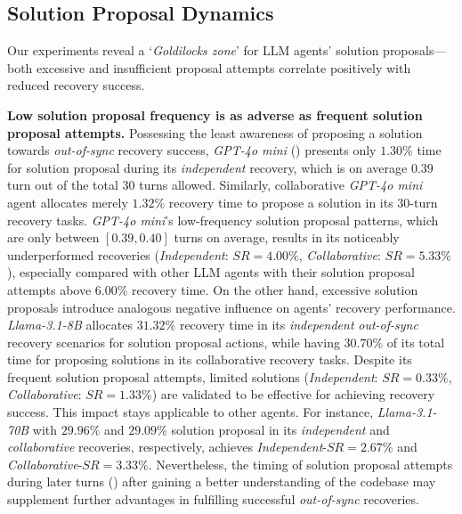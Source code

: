 \subsection{Solution Proposal Dynamics}
\label{Appendix:C.3 (Solution Proposal Dynamics)}

Our experiments reveal a `\textit{Goldilocks zone}' for LLM agents' \textcolor{fig2_code}{solution proposals}---both excessive and insufficient proposal attempts correlate positively with reduced recovery success.

\textbf{Low solution proposal frequency is as adverse as frequent solution proposal attempts.}
%
%
Possessing the least awareness of \textcolor{fig2_code}{proposing a solution} towards \textit{out-of-sync} recovery success, \textit{GPT-4o mini} () presents only $1.30\%$ time for \textcolor{fig2_code}{solution proposal} during its \textit{independent} recovery, which is on average $0.39$ turn out of the total $30$ turns allowed.
Similarly, collaborative \textit{GPT-4o mini} agent allocates merely $1.32\%$ recovery time to \textcolor{fig2_code}{propose a solution} in its $30$-turn recovery tasks. \textit{GPT-4o mini}'s low-frequency \textcolor{fig2_code}{solution proposal} patterns, which are only between $[0.39, 0.40]$ turns on average, results in its noticeably underperformed recoveries (\textit{Independent}: $SR=4.00\%$, \textit{Collaborative}: $SR=5.33\%$), especially compared with other LLM agents with their \textcolor{fig2_code}{solution proposal} attempts above $6.00\%$ recovery time.
%
%
On the other hand, excessive \textcolor{fig2_code}{solution proposals} introduce analogous negative influence on agents' recovery performance. \textit{Llama-3.1-8B} allocates $31.32\%$ recovery time in its \textit{independent} \textit{out-of-sync} recovery scenarios for \textcolor{fig2_code}{solution proposal} actions, while having $30.70\%$ of its total time for \textcolor{fig2_code}{proposing solutions} in its collaborative recovery tasks. Despite its frequent \textcolor{fig2_code}{solution proposal} attempts, limited solutions (\textit{Independent}: $SR=0.33\%$, \textit{Collaborative}: $SR=1.33\%$) are validated to be effective for achieving recovery success.
This impact stays applicable to other agents. For instance, \textit{Llama-3.1-70B} with $29.96\%$ and $29.09\%$ \textcolor{fig2_code}{solution proposal} in its \textit{independent} and \textit{collaborative} recoveries, respectively, achieves \textit{Independent}-$SR=2.67\%$ and \textit{Collaborative}-$SR=3.33\%$. Nevertheless, the timing of \textcolor{fig2_code}{solution proposal} attempts during later turns () after gaining a better understanding of the codebase may supplement further advantages in fulfilling successful \textit{out-of-sync} recoveries.






